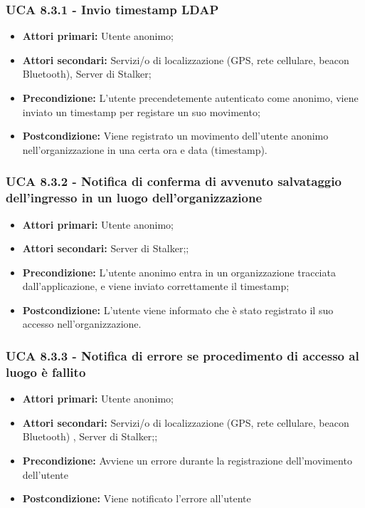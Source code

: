 \subsubsection{UCA 8.3.1 - Invio timestamp LDAP}%
\begin{itemize}
	\item \textbf{Attori primari:} Utente anonimo;
	\item \textbf{Attori secondari:}  Servizi/o di localizzazione (GPS, rete cellulare, beacon Bluetooth), Server di Stalker;
	\item \textbf{Precondizione:} L'utente precendetemente autenticato come anonimo, viene inviato un timestamp per registare un suo movimento;
	\item \textbf{Postcondizione:} Viene registrato un movimento dell'utente anonimo nell'organizzazione in una certa ora e data (timestamp).
\end{itemize}

\subsubsection{UCA 8.3.2 - Notifica di conferma di avvenuto salvataggio dell'ingresso in un luogo dell'organizzazione}%
\begin{itemize}
	\item \textbf{Attori primari:} Utente anonimo;
	\item \textbf{Attori secondari:} Server di Stalker;;
	\item \textbf{Precondizione:} L'utente anonimo entra in un organizzazione tracciata dall'applicazione, e viene  inviato correttamente il timestamp;
	\item \textbf{Postcondizione:} L'utente viene informato che è stato registrato il suo accesso nell'organizzazione.
\end{itemize}

\subsubsection{UCA 8.3.3 - Notifica di errore se procedimento di accesso al luogo è fallito}%
\begin{itemize}
	\item \textbf{Attori primari:} Utente anonimo;
	\item \textbf{Attori secondari:} Servizi/o di localizzazione (GPS, rete cellulare, beacon Bluetooth) , Server di Stalker;;
	\item \textbf{Precondizione:} Avviene un errore durante la registrazione dell'movimento dell'utente
	\item \textbf{Postcondizione:} Viene notificato l'errore all'utente
\end{itemize}

